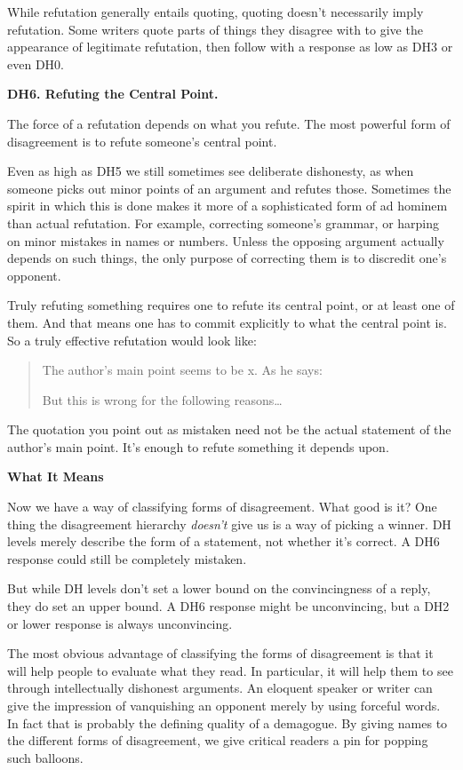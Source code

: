\documentclass[12pt]{book}
\begin{document}
While refutation generally entails quoting, quoting doesn't necessarily
imply refutation. Some writers quote parts of things they disagree with
to give the appearance of legitimate refutation, then follow with a
response as low as DH3 or even DH0.

\textbf{DH6. Refuting the Central Point.}

The force of a refutation depends on what you refute. The most powerful
form of disagreement is to refute someone's central point.

Even as high as DH5 we still sometimes see deliberate dishonesty, as
when someone picks out minor points of an argument and refutes those.
Sometimes the spirit in which this is done makes it more of a
sophisticated form of ad hominem than actual refutation. For example,
correcting someone's grammar, or harping on minor mistakes in names or
numbers. Unless the opposing argument actually depends on such things,
the only purpose of correcting them is to discredit one's opponent.

Truly refuting something requires one to refute its central point, or at
least one of them. And that means one has to commit explicitly to what
the central point is. So a truly effective refutation would look like:

\begin{quote}
The author's main point seems to be x. As he says:

\begin{quote}
\end{quote}

But this is wrong for the following reasons\ldots{}
\end{quote}

The quotation you point out as mistaken need not be the actual statement
of the author's main point. It's enough to refute something it depends
upon.

\textbf{What It Means}

Now we have a way of classifying forms of disagreement. What good is it?
One thing the disagreement hierarchy \emph{doesn't} give us is a way of
picking a winner. DH levels merely describe the form of a statement, not
whether it's correct. A DH6 response could still be completely mistaken.

But while DH levels don't set a lower bound on the convincingness of a
reply, they do set an upper bound. A DH6 response might be unconvincing,
but a DH2 or lower response is always unconvincing.

The most obvious advantage of classifying the forms of disagreement is
that it will help people to evaluate what they read. In particular, it
will help them to see through intellectually dishonest arguments. An
eloquent speaker or writer can give the impression of vanquishing an
opponent merely by using forceful words. In fact that is probably the
defining quality of a demagogue. By giving names to the different forms
of disagreement, we give critical readers a pin for popping such
balloons.
\end{document}
